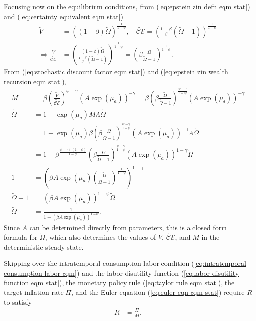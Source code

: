 \documentclass[12 pt, oneside]{article}
\theoremstyle{definition}
\theoremstyle{definition}
\theoremstyle{definition}
\newcommand{\calC}{\mathcal{C}}
\newcommand{\calE}{\mathcal{E}}
\newcommand{\RA}{\Rightarrow}
\begin{document}
Focusing now on the equilibrium conditions, from (\ref{eq:epstein zin defn eqm stat}) and (\ref{eq:certainty equivalent eqm stat})
\begin{align*}
  \tilde{V} & = ((1 - \beta) \tilde{\Omega})^{\frac{1}{1 - \psi}},\quad \tilde{\calC\calE} = \left(\frac{1 - \beta}{\beta} (\tilde{\Omega} - 1)\right)^{\frac{1}{1 - \psi}}\\
  \RA \frac{\tilde{V}}{\tilde{\calC\calE}} & = \left(\frac{(1 - \beta)\tilde{\Omega}}{\frac{1 - \beta}{\beta} (\tilde{\Omega} - 1)}\right)^{\frac{1}{1 - \psi}} = \left(\beta\frac{\tilde{\Omega}}{\tilde{\Omega} - 1}\right)^{\frac{1}{1 - \psi}}.
\end{align*}
From (\ref{eq:stochastic discount factor eqm stat}) and (\ref{eq:epstein zin wealth recursion eqm stat}),
\begin{align*}
  M & = \beta\left(\frac{\tilde{V}}{\tilde{\calC\calE}}\right)^{\psi - \gamma}(A\exp(\mu_a))^{ - \gamma} = \beta\left(\beta\frac{\tilde{\Omega}}{\tilde{\Omega} - 1}\right)^{\frac{\psi - \gamma}{1 - \psi}}(A\exp(\mu_a))^{ - \gamma}\\
  \tilde{\Omega} & = 1 + \exp(\mu_a)M A \tilde{\Omega}\\
    & = 1 + \exp(\mu_a)\beta\left(\beta\frac{\tilde{\Omega}}{\tilde{\Omega} - 1}\right)^{\frac{\psi - \gamma}{1 - \psi}}(A\exp(\mu_a))^{ - \gamma} A \tilde{\Omega}\\
    & = 1 +\beta^{\frac{\psi - \gamma + (1 - \psi)}{1 - \psi}}\left(\beta\frac{\tilde{\Omega}}{\tilde{\Omega} - 1}\right)^{\frac{\psi - \gamma}{1 - \psi}}(A\exp(\mu_a))^{1 - \gamma} \tilde{\Omega}\\
  1 & =  \left(\beta A \exp(\mu_a)\left(\frac{\tilde{\Omega}}{\tilde{\Omega} - 1}\right)^{\frac{1}{1 - \psi}}\right)^{1 - \gamma}\\
  \tilde{\Omega} - 1 & = (\beta A \exp(\mu_a))^{1 - \psi} \tilde{\Omega}\\
  \tilde{\Omega} & = \frac{1}{1 - (\beta A \exp(\mu_a))^{1 - \psi}}.
\end{align*}
Since $A$ can be determined directly from parameters, this is a closed form formula for $\tilde{\Omega}$, which also determines the values of $\tilde{V}$, $\tilde{\calC\calE}$, and $M$ in the deterministic steady state.

Skipping over the intratemporal consumption-labor condition (\ref{eq:intratemporal consumption labor eqm}) and the labor disutility function (\ref{eq:labor disutility function eqm stat}), the monetary policy rule (\ref{eq:taylor rule eqm stat}), the target inflation rate $\Pi$, and the Euler equation (\ref{eq:euler eqn eqm stat}) require $R$ to satisfy
\begin{align}
  R & = \frac{\Pi}{M}.
\end{align}
\end{document}
